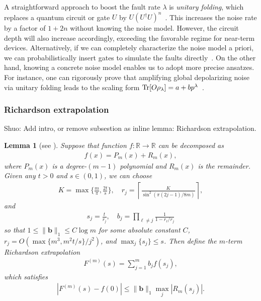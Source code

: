 \documentclass[11pt]{article}
\newtheorem{lemma}{Lemma}
\newcommand{\mb}{\mathbb}
\newcommand{\sz}[1]{{\color{blue} Shuo: #1}}
\begin{document}
A straightforward approach to boost the fault rate $\lambda$ is \textit{unitary folding}, which replaces a quantum circuit or gate $U$ by $U(U^\dagger U)^n$~\cite{giurgica-tiron_digital_2020, DumitrescuEtAl2018, HeEtAl2020}. This increases the noise rate by a factor of $1+2n$ without knowing the noise model. However, the circuit depth will also increase accordingly, exceeding the favorable regime for near-term devices. Alternatively, if we can completely characterize the noise model a priori, we can probabilistically insert gates to simulate the faults directly~\cite {li2017efficient}. On the other hand, knowing a concrete noise model enables us to adopt more precise ansatzes. For instance, one can rigorously prove that amplifying global depolarizing noise via unitary folding leads to the scaling form $\Tr[O\rho_\lambda]=a+bp^\lambda$~\cite{giurgica-tiron_digital_2020}.


\subsubsection{Richardson extrapolation}\label{sec:Richardson}
\sz{Add intro, or remove subsestion as inline lemma: Richardson extrapolation.}
\begin{lemma}[{see \cite[Lemma A.9]{wang2025randomized}}]
\label{lem:richardson-extrapolation}
    Suppose that function $f\colon \mb R \to \mathbb{R}$ can be decomposed as 
    \begin{align*}
        f(x) = P_m(x)+R_m(x),
    \end{align*} 
    where $P_m(x)$ is a degree-$(m-1)$ polynomial and $R_m(x)$ is the remainder. Given any $t > 0$ and $s\in (0,1)$, we can choose 
    \begin{align*}
        K = \max\Big\{\frac{m}{\pi}, \frac{2t}{s}\Big\}, \quad r_j =\left\lceil \frac{K}{\sin^2(\pi(2j-1)/8m)}\right\rceil,
    \end{align*}
    and
    \begin{align*}
        s_j = \frac{t}{r_j}, \quad b_j=\prod_{\ell \neq j} \frac{1}{1-r_\ell/r_j}
    \end{align*}
    so that $1\le \|\mathbf{b}\|_1 \le C\log m$ for some absolute constant $C$, $r_j=O(\max\{m^3, m^2t/s\}/j^2)$, and $\max_{j}\{ s_j \}\le s$. Then define the $m$-term Richardson extrapolation \begin{align}
        \label{eq_richardson extrapolation}
        F^{(m)}(s)=\sum_{j=1}^m b_j f(s_j),
    \end{align}
    which satisfies \begin{align}
    \label{eq:error-F}
        |F^{(m)}(s)-f(0)|\le \|\mathbf{b}\|_1 \max_j|R_{m}(s_j)|.
    \end{align}
\end{lemma}
\end{document}
